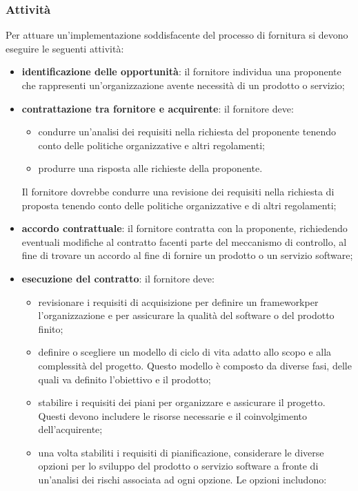 	\subsubsection{Attività}
	Per attuare un'implementazione soddisfacente del processo di fornitura si devono eseguire le seguenti attività:
\begin{itemize}
\item \textbf{identificazione delle opportunità}: il fornitore individua una proponente che rappresenti un'organizzazione avente necessità di un prodotto o servizio;
\item \textbf{contrattazione tra fornitore e acquirente}: il fornitore deve:
\begin{itemize}
\item condurre un'analisi dei requisiti nella richiesta del proponente tenendo conto delle politiche organizzative e altri regolamenti;

\item produrre una risposta alle richieste della proponente.
\end{itemize}
Il fornitore dovrebbe condurre una revisione dei requisiti nella richiesta di proposta tenendo conto delle politiche organizzative e di altri regolamenti;

\item \textbf{accordo contrattuale}: il fornitore contratta con la proponente, richiedendo eventuali modifiche al contratto facenti parte del meccanismo di controllo, al fine di trovare un accordo al fine di fornire un prodotto o un servizio software;

\item \textbf{esecuzione del contratto}: il fornitore deve:
\begin{itemize}
\item revisionare i requisiti di acquisizione per definire un framework\glosp per l'organizzazione e per assicurare la qualità del software o del prodotto finito;

\item definire o scegliere un modello di ciclo di vita adatto allo scopo e alla complessità del progetto. Questo modello è composto da diverse fasi, delle quali va definito l'obiettivo e il prodotto;

\item stabilire i requisiti dei piani per organizzare e assicurare il progetto. Questi devono includere le risorse necessarie e il coinvolgimento dell'acquirente;

\item una volta stabiliti i requisiti di pianificazione, considerare le diverse opzioni per lo sviluppo del prodotto o servizio software a fronte di un'analisi dei rischi associata ad ogni opzione. Le opzioni includono:


\end{itemize}
\end{itemize}
